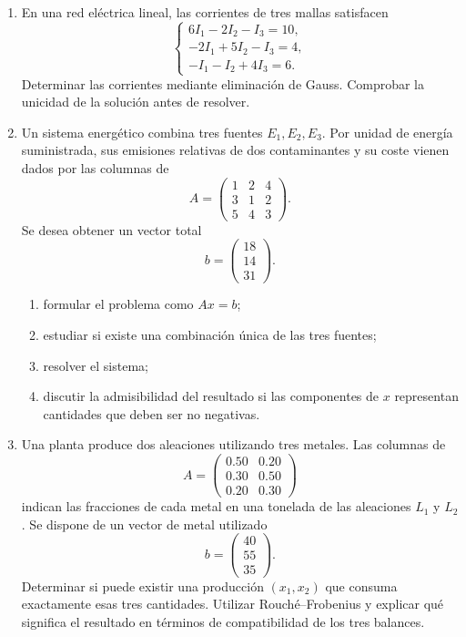 \begin{enumerate}[label=\textbf{\arabic*.},leftmargin=*]
\item En una red eléctrica lineal, las corrientes de tres mallas satisfacen
\[
\begin{cases}
6I_1-2I_2-I_3=10,\\
-2I_1+5I_2-I_3=4,\\
-I_1-I_2+4I_3=6.
\end{cases}
\]
Determinar las corrientes mediante eliminación de Gauss. Comprobar la unicidad de la solución antes de resolver.

\item Un sistema energético combina tres fuentes $E_1,E_2,E_3$. Por unidad de energía suministrada, sus emisiones relativas de dos contaminantes y su coste vienen dados por las columnas de
\[
A=
\begin{pmatrix}
1&2&4\\
3&1&2\\
5&4&3
\end{pmatrix}.
\]
Se desea obtener un vector total
\[
b=\begin{pmatrix}18\\14\\31\end{pmatrix}.
\]
\begin{enumerate}[label=\alph*)]
\item formular el problema como $Ax=b$;
\item estudiar si existe una combinación única de las tres fuentes;
\item resolver el sistema;
\item discutir la admisibilidad del resultado si las componentes de $x$ representan cantidades que deben ser no negativas.
\end{enumerate}

\item Una planta produce dos aleaciones utilizando tres metales. Las columnas de
\[
A=\begin{pmatrix}
0.50&0.20\\
0.30&0.50\\
0.20&0.30
\end{pmatrix}
\]
indican las fracciones de cada metal en una tonelada de las aleaciones $L_1$ y $L_2$. Se dispone de un vector de metal utilizado
\[
b=\begin{pmatrix}40\\55\\35\end{pmatrix}.
\]
Determinar si puede existir una producción $(x_1,x_2)$ que consuma exactamente esas tres cantidades. Utilizar Rouché--Frobenius y explicar qué significa el resultado en términos de compatibilidad de los tres balances.


\end{enumerate}
